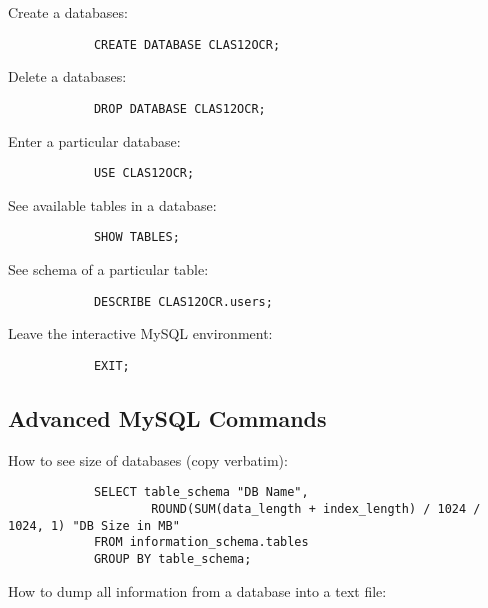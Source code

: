         Create a databases:
        
        \begin{lstlisting}
            CREATE DATABASE CLAS12OCR;
        \end{lstlisting}
        
        Delete a databases:
        
        \begin{lstlisting}
            DROP DATABASE CLAS12OCR;
        \end{lstlisting}
        
        Enter a particular database:
        
        \begin{lstlisting}
            USE CLAS12OCR;
        \end{lstlisting}
        
        See available tables in a database:
        
        \begin{lstlisting}
            SHOW TABLES;
        \end{lstlisting}
        
        See schema of a particular table:
        
        \begin{lstlisting}
            DESCRIBE CLAS12OCR.users;
        \end{lstlisting}
        
        Leave the interactive MySQL environment:
        
        \begin{lstlisting}
            EXIT;
        \end{lstlisting}
    
    \subsection{Advanced MySQL Commands}
    
    How to see size of databases (copy verbatim):

        \begin{lstlisting}
            SELECT table_schema "DB Name",
                    ROUND(SUM(data_length + index_length) / 1024 / 1024, 1) "DB Size in MB" 
            FROM information_schema.tables 
            GROUP BY table_schema; 
        \end{lstlisting}
    
    How to dump all information from a database into a text file:
    
